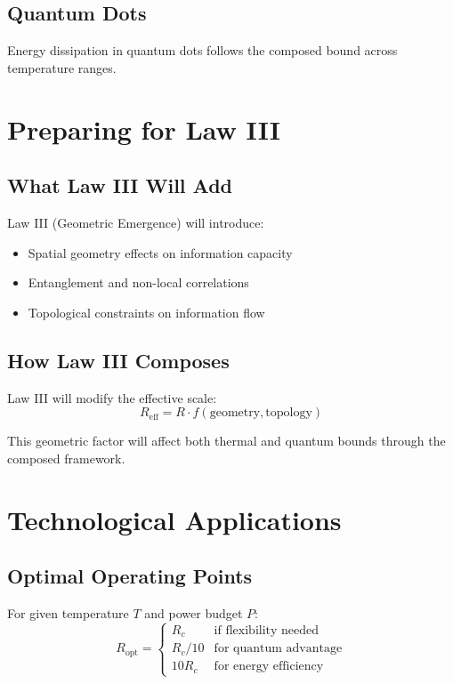 \documentclass[11pt,a4paper]{article}
\theoremstyle{definition}
\begin{document}
\subsection{Quantum Dots}
Energy dissipation in quantum dots follows the composed bound across temperature ranges.

\section{Preparing for Law III}

\subsection{What Law III Will Add}

Law III (Geometric Emergence) will introduce:
\begin{itemize}
\item Spatial geometry effects on information capacity
\item Entanglement and non-local correlations
\item Topological constraints on information flow
\end{itemize}

\subsection{How Law III Composes}

Law III will modify the effective scale:
\begin{equation}
R_{\text{eff}} = R \cdot f(\text{geometry}, \text{topology})
\end{equation}

This geometric factor will affect both thermal and quantum bounds through the composed framework.

\section{Technological Applications}

\subsection{Optimal Operating Points}

For given temperature $T$ and power budget $P$:
\begin{equation}
R_{\text{opt}} = \begin{cases}
R_c & \text{if flexibility needed} \\
R_c / 10 & \text{for quantum advantage} \\
10 R_c & \text{for energy efficiency}
\end{cases}
\end{equation}
\end{document}
